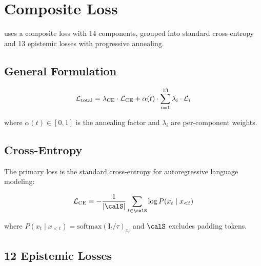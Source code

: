 
\section{Composite Loss}
\label{sec:loss}

\aletheion{} uses a composite loss with 14 components, grouped into
standard cross-entropy and 13 epistemic losses with progressive
annealing.

\subsection{General Formulation}

\begin{equation}
    \mathcal{L}_{\text{total}} = \lambda_{\text{CE}} \cdot \mathcal{L}_{\text{CE}} + \alpha(t) \cdot \sum_{i=1}^{13} \lambda_i \cdot \mathcal{L}_i
    \label{eq:total_loss}
\end{equation}

where $\alpha(t) \in [0, 1]$ is the annealing factor and $\lambda_i$
are per-component weights.

\subsection{Cross-Entropy}

The primary loss is the standard cross-entropy for autoregressive
language modeling:

\begin{equation}
    \calL_{\text{CE}} = -\frac{1}{|\calS|} \sum_{t \in \calS} \log P(x_t \mid x_{<t})
\end{equation}

where $P(x_t \mid x_{<t}) = \text{softmax}(\bm{l}_t / \tau)_{x_t}$ and
$\calS$ excludes padding tokens.

\subsection{12 Epistemic Losses}

